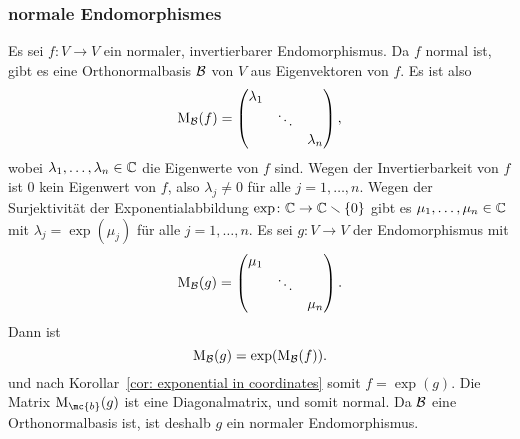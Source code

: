 \documentclass[a4paper, 10pt]{article}
\begin{document}
\subsubsection{normale Endomorphismes}
Es sei $f \colon V \to V$ ein normaler, invertierbarer Endomorphismus.
Da $f$ normal ist, gibt es eine Orthonormalbasis $\mathcal{B}$ von $V$ aus Eigenvektoren von $f$.
Es ist also
\[
  \operatorname{M}_{\mathcal{B}}(f)
  =
  \begin{pmatrix}
    \lambda_1 &         &           \\
              & \ddots  &           \\
              &         & \lambda_n
  \end{pmatrix},
\]
wobei $\lambda_1, \dotsc, \lambda_n \in \mathbb{C}$ die Eigenwerte von $f$ sind.
Wegen der Invertierbarkeit von $f$ ist $0$ kein Eigenwert von $f$, also $\lambda_j \neq 0$ für alle $j = 1, \dotsc, n$.
Wegen der Surjektivität der Exponentialabbildung $\exp \colon \mathbb{C} \to \mathbb{C} \smallsetminus \{0\}$ gibt es $\mu_1, \dotsc, \mu_n \in \mathbb{C}$ mit $\lambda_j = \exp(\mu_j)$ für alle $j = 1, \dotsc, n$.
Es sei $g \colon V \to V$ der Endomorphismus mit
\[
  \operatorname{M}_{\mathcal{B}}(g)
  =
  \begin{pmatrix}
    \mu_1 &         &       \\
          & \ddots  &       \\
          &         & \mu_n
  \end{pmatrix}.
\]
Dann ist
\[
  \operatorname{M}_{\mathcal{B}}(g) = \exp( \operatorname{M}_{\mathcal{B}}(f) ).
\]
und nach Korollar~\ref{cor: exponential in coordinates} somit $f = \exp(g)$.
Die Matrix $\Mat_\mc{b}(g)$ ist eine Diagonalmatrix, und somit normal.
Da $\mathcal{B}$ eine Orthonormalbasis ist, ist deshalb $g$ ein normaler Endomorphismus.
\end{document}
